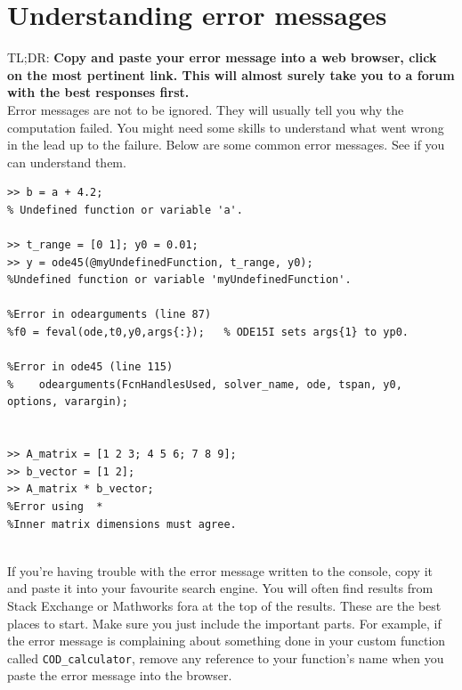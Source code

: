 \documentclass[12pt]{article}
\begin{document}
\newpage
\section{Understanding error messages}
TL;DR: \textbf{Copy and paste your error message into a web browser, click on the most pertinent link. This will almost surely take you to a forum with the best responses first.}\\

Error messages are not to be ignored. They will usually tell you why the computation failed. You might need some skills to understand what went wrong in the lead up to the failure. Below are some common error messages. See if you can understand them.\\

\begin{lstlisting}
>> b = a + 4.2;
% Undefined function or variable 'a'.

>> t_range = [0 1]; y0 = 0.01;
>> y = ode45(@myUndefinedFunction, t_range, y0);
%Undefined function or variable 'myUndefinedFunction'.

%Error in odearguments (line 87)
%f0 = feval(ode,t0,y0,args{:});   % ODE15I sets args{1} to yp0.

%Error in ode45 (line 115)
%    odearguments(FcnHandlesUsed, solver_name, ode, tspan, y0, options, varargin);


>> A_matrix = [1 2 3; 4 5 6; 7 8 9];
>> b_vector = [1 2];
>> A_matrix * b_vector;
%Error using  * 
%Inner matrix dimensions must agree.


\end{lstlisting}

If you're having trouble with the error message written to the console, copy it and paste it into your favourite search engine. You will often find results from Stack Exchange or Mathworks fora at the top of the results. These are the best places to start. Make sure you just include the important parts. For example, if the error message is complaining about something done in your custom function called \texttt{COD\_calculator}, remove any reference to your function's name when you paste the error message into the browser. 
\end{document}
